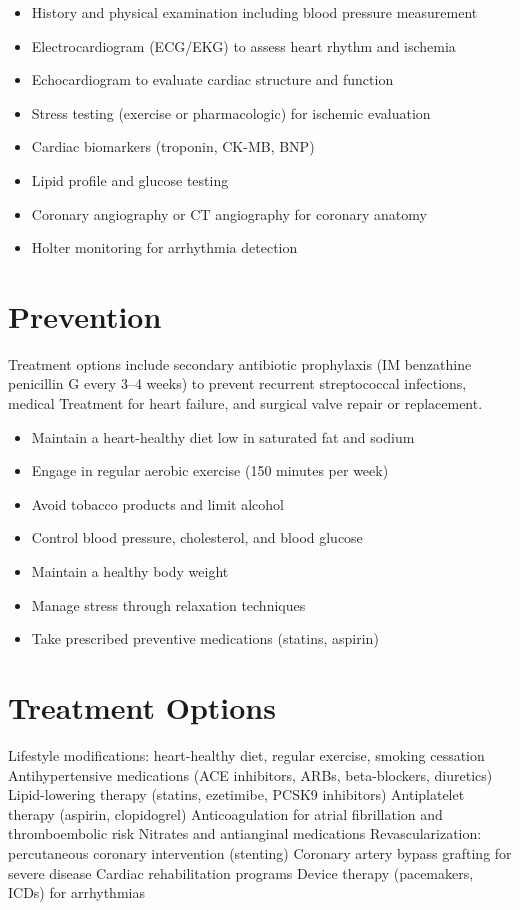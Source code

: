 \begin{itemize}[noitemsep]
  \item History and physical examination including blood pressure measurement
  \item Electrocardiogram (ECG/EKG) to assess heart rhythm and ischemia
  \item Echocardiogram to evaluate cardiac structure and function
  \item Stress testing (exercise or pharmacologic) for ischemic evaluation
  \item Cardiac biomarkers (troponin, CK-MB, BNP)
  \item Lipid profile and glucose testing
  \item Coronary angiography or CT angiography for coronary anatomy
  \item Holter monitoring for arrhythmia detection
\end{itemize}
\section{Prevention}
Treatment options include secondary antibiotic prophylaxis (IM benzathine penicillin G every 3--4 weeks) to prevent recurrent streptococcal infections, medical Treatment for heart failure, and surgical valve repair or replacement.

\begin{itemize}[noitemsep]
  \item Maintain a heart-healthy diet low in saturated fat and sodium
  \item Engage in regular aerobic exercise (150 minutes per week)
  \item Avoid tobacco products and limit alcohol
  \item Control blood pressure, cholesterol, and blood glucose
  \item Maintain a healthy body weight
  \item Manage stress through relaxation techniques
  \item Take prescribed preventive medications (statins, aspirin)
\end{itemize}
\section{Treatment Options}
Lifestyle modifications: heart-healthy diet, regular exercise, smoking cessation Antihypertensive medications (ACE inhibitors, ARBs, beta-blockers, diuretics) Lipid-lowering therapy (statins, ezetimibe, PCSK9 inhibitors) Antiplatelet therapy (aspirin, clopidogrel) Anticoagulation for atrial fibrillation and thromboembolic risk Nitrates and antianginal medications Revascularization: percutaneous coronary intervention (stenting) Coronary artery bypass grafting for severe disease Cardiac rehabilitation programs Device therapy (pacemakers, ICDs) for arrhythmias

